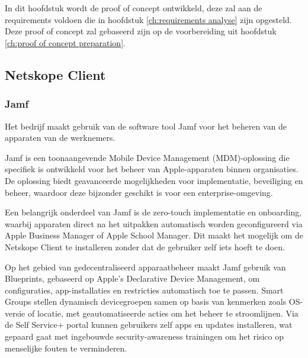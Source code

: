 
\chapter{}%
\label{ch:proof of concept implementation}

In dit hoofdstuk wordt de proof of concept ontwikkeld, deze zal aan de requirements voldoen die in hoofdstuk \ref{ch:requirements analyse} zijn opgesteld. Deze proof of concept zal gebaseerd zijn op de voorbereiding uit hoofdstuk \ref{ch:proof of concept preparation}.

\section{Netskope Client}

\subsection{Jamf}
Het bedrijf maakt gebruik van de software tool Jamf voor het beheren van de apparaten van de werknemers.

Jamf is een toonaangevende Mobile Device Management (MDM)-oplossing die specifiek is ontwikkeld voor het beheer van Apple-apparaten binnen organisaties. De oplossing biedt geavanceerde mogelijkheden voor implementatie, beveiliging en beheer, waardoor deze bijzonder geschikt is voor een enterprise-omgeving.  

Een belangrijk onderdeel van Jamf is de zero-touch implementatie en onboarding, waarbij apparaten direct na het uitpakken automatisch worden geconfigureerd via Apple Business Manager of Apple School Manager.  Dit maakt het mogelijk om de Netskope Client te installeren zonder dat de gebruiker zelf iets hoeft te doen.

Op het gebied van gedecentraliseerd apparaatbeheer maakt Jamf gebruik van Blueprints, gebaseerd op Apple’s Declarative Device Management, om configuraties, app-installaties en restricties automatisch toe te passen. Smart Groups stellen dynamisch devicegroepen samen op basis van kenmerken zoals OS-versie of locatie, met geautomatiseerde acties om het beheer te stroomlijnen. Via de Self Service+ portal kunnen gebruikers zelf apps en updates installeren, wat gepaard gaat met ingebouwde security-awareness trainingen om het risico op menselijke fouten te verminderen. ~\autocite{Jamf2025}

